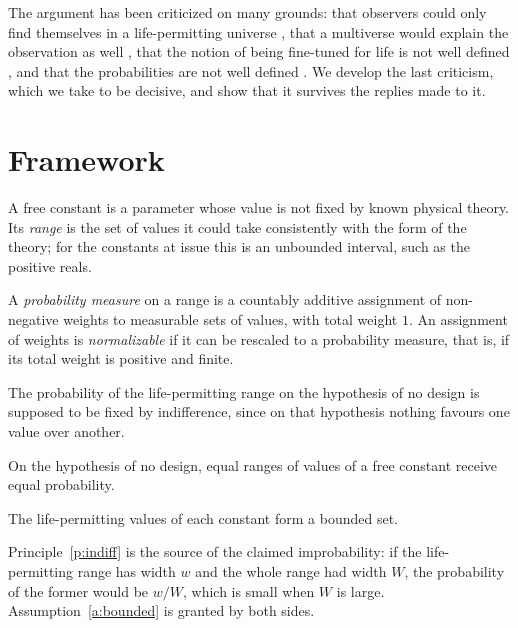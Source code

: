 \documentclass{situationist-preprint}
\begin{document}
The argument has been criticized on many grounds: that observers could only find themselves in a life-permitting universe \citep{Carter1974}, that a multiverse would explain the observation as well \citep{Leslie1989}, that the notion of being fine-tuned for life is not well defined \citep{Manson2000}, and that the probabilities are not well defined \citep{McGrewMcGrewVestrup2001,ColyvanGarfieldPriest2005}. We develop the last criticism, which we take to be decisive, and show that it survives the replies made to it.

\section{Framework}

\begin{definition}\label{d:space}
A free constant is a parameter whose value is not fixed by known physical theory. Its \emph{range} is the set of values it could take consistently with the form of the theory; for the constants at issue this is an unbounded interval, such as the positive reals.
\end{definition}

\begin{definition}\label{d:norm}
A \emph{probability measure} on a range is a countably additive assignment of non-negative weights to measurable sets of values, with total weight $1$. An assignment of weights is \emph{normalizable} if it can be rescaled to a probability measure, that is, if its total weight is positive and finite.
\end{definition}

The probability of the life-permitting range on the hypothesis of no design is supposed to be fixed by indifference, since on that hypothesis nothing favours one value over another.

\begin{principle}[Indifference]\label{p:indiff}
On the hypothesis of no design, equal ranges of values of a free constant receive equal probability.
\end{principle}

\begin{assumption}\label{a:bounded}
The life-permitting values of each constant form a bounded set.
\end{assumption}

Principle~\ref{p:indiff} is the source of the claimed improbability: if the life-permitting range has width $w$ and the whole range had width $W$, the probability of the former would be $w/W$, which is small when $W$ is large. Assumption~\ref{a:bounded} is granted by both sides.
\end{document}
